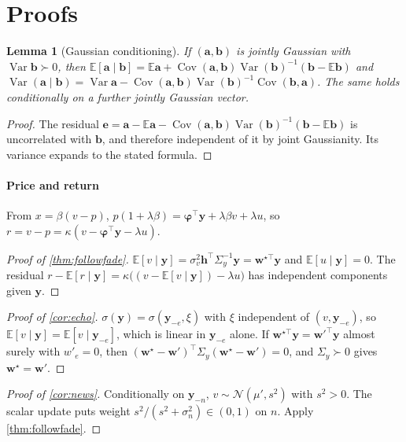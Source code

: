 \documentclass[10pt,twocolumn,letterpaper]{article}
\theoremstyle{plain}
\newtheorem{lemma}[theorem]{Lemma}
\theoremstyle{definition}
\theoremstyle{remark}
\newcommand{\E}{\mathbb{E}}
\newcommand{\N}{\mathcal{N}}
\newcommand{\w}{\bm{w}}
\newcommand{\y}{\bm{y}}
\newcommand{\h}{\bm{h}}
\newcommand{\bphi}{\bm{\varphi}}
\DeclareMathOperator{\Var}{Var}
\DeclareMathOperator{\Cov}{Cov}
\begin{document}
\onecolumn
\appendix
\section{Proofs}\label{app:proofs}

\begin{lemma}[Gaussian conditioning]\label{lem:gauss}
If $(\bm a,\bm b)$ is jointly Gaussian with $\Var\bm b\succ0$, then $\E[\bm a\mid\bm b]=\E\bm a+\Cov(\bm a,\bm b)\Var(\bm b)^{-1}(\bm b-\E\bm b)$ and $\Var(\bm a\mid\bm b)=\Var\bm a-\Cov(\bm a,\bm b)\Var(\bm b)^{-1}\Cov(\bm b,\bm a)$. The same holds conditionally on a further jointly Gaussian vector.
\end{lemma}
\begin{proof}
The residual $\bm e=\bm a-\E\bm a-\Cov(\bm a,\bm b)\Var(\bm b)^{-1}(\bm b-\E\bm b)$ is uncorrelated with $\bm b$, and therefore independent of it by joint Gaussianity. Its variance expands to the stated formula.
\end{proof}

\paragraph{Price and return} From $x=\beta(v-p)$, $p(1+\lambda\beta)=\bphi^\top\y+\lambda\beta v+\lambda u$, so $r=v-p=\kappa(v-\bphi^\top\y-\lambda u)$.

\begin{proof}[Proof of \cref{thm:followfade}]
$\E[v\mid\y]=\sigma_v^2\h^\top\Sigma_y^{-1}\y=\w^{\star\top}\y$ and $\E[u\mid\y]=0$. The residual $r-\E[r\mid\y]=\kappa\big((v-\E[v\mid\y])-\lambda u\big)$ has independent components given $\y$.
\end{proof}

\begin{proof}[Proof of \cref{cor:echo}]
$\sigma(\y)=\sigma(\y_{-e},\xi)$ with $\xi$ independent of $(v,\y_{-e})$, so $\E[v\mid\y]=\E[v\mid\y_{-e}]$, which is linear in $\y_{-e}$ alone. If $\w^{\star\top}\y=\w'^\top\y$ almost surely with $w'_e=0$, then $(\w^\star-\w')^\top\Sigma_y(\w^\star-\w')=0$, and $\Sigma_y\succ0$ gives $\w^\star=\w'$.
\end{proof}

\begin{proof}[Proof of \cref{cor:news}]
Conditionally on $\y_{-n}$, $v\sim\N(\mu',s^2)$ with $s^2>0$. The scalar update puts weight $s^2/(s^2+\sigma_n^2)\in(0,1)$ on $n$. Apply \cref{thm:followfade}.
\end{proof}
\end{document}

